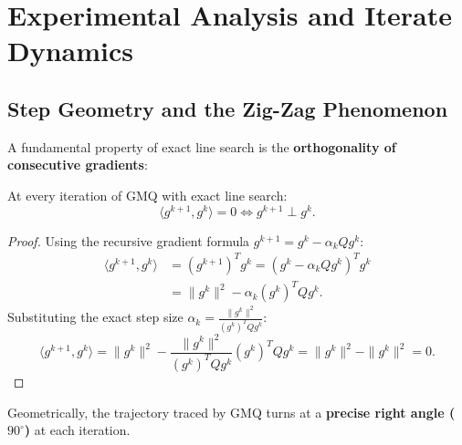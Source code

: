 \FloatBarrier
\section{Experimental Analysis and Iterate Dynamics}
\label{sec:experimental-analysis-gmq}

\subsection{Step Geometry and the Zig-Zag Phenomenon}
A fundamental property of exact line search is the \textbf{orthogonality of consecutive gradients}:
\begin{proposition}
At every iteration of GMQ with exact line search:
\begin{equation}
    \langle g^{k+1}, g^k \rangle = 0 \iff g^{k+1} \perp g^k.
\end{equation}
\end{proposition}

\begin{proof}
Using the recursive gradient formula $g^{k+1} = g^k - \alpha_k Q g^k$:
\begin{align}
    \langle g^{k+1}, g^k \rangle &= (g^{k+1})^T g^k = (g^k - \alpha_k Q g^k)^T g^k \nonumber \\
    &= \|g^k\|^2 - \alpha_k (g^k)^T Q g^k.
\end{align}
Substituting the exact step size $\alpha_k = \frac{\|g^k\|^2}{(g^k)^T Q g^k}$:
\begin{equation}
    \langle g^{k+1}, g^k \rangle = \|g^k\|^2 - \frac{\|g^k\|^2}{(g^k)^T Q g^k} (g^k)^T Q g^k = \|g^k\|^2 - \|g^k\|^2 = 0.
\end{equation}
\end{proof}

Geometrically, the trajectory traced by GMQ turns at a \textbf{precise right angle ($90^\circ$)} at each iteration.

